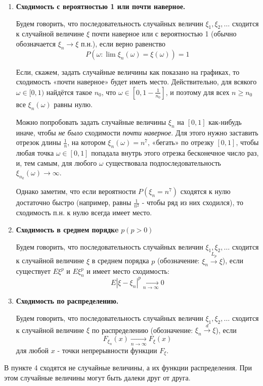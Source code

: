 \begin{enumerate}
	\item \textbf{Сходимость с вероятностью 1 или почти наверное.}
	
	Будем говорить, что последовательность случайных величин $\xi_1, \xi_2, \dots$ сходится к случайной величине $\xi$ почти наверное или с вероятностью 1 (обычно обозначается $\xi_n \to \xi$ п.н.), если верно равенство
	\[ P(\omega : \lim \xi_n (\omega) = \xi (\omega)) = 1 \]
	
	\begin{exmp}
		Если, скажем, задать случайные величины как показано на графиках, то сходимость «почти наверное»  будет иметь место. Действительно, для всякого $\omega \in [0, 1)$ найдётся такое $n_0$, что $\omega \in \left[ 0, 1 - \frac{1}{n_0} \right]$, и поэтому для всех $n \ge n_0$ все $\xi_n (\omega)$ равны нулю.
		
		Можно попробовать задать случайные величины $\xi_n$ на $[0, 1]$ как-нибудь иначе, чтобы \textit{не было} сходимости \textit{почти наверное}. Для этого нужно заставить отрезок длины $\frac{1}{n}$, на котором $\xi_n (\omega) = n^7$, «бегать» по отрезку $[0, 1]$, чтобы любая точка $\omega \in [0, 1]$ попадала внутрь этого отрезка бесконечное число раз, и, тем самым, для любого $\omega$ существовала подпоследовательность $\xi_{n_k} (\omega) \to \infty$.
		
		Однако заметим, что если вероятности $P(\xi_n = n^7)$ сходятся к нулю достаточно быстро (например, равны $\frac{1}{n^2}$ - чтобы ряд из них сходился), то сходимость п.н. к нулю всегда имеет место.
	\end{exmp}
	
	\item \textbf{Сходимость в среднем порядкe} $p(p > 0)$
	
	Будем говорить, что последовательность случайных величин $\xi_1, \xi_2, \dots$ сходится к случайной величине $\xi$ в среднем порядка $p$ (обозначение: $\xi_n \overset{L_p}{\to} \xi$), если существует $E\xi^p$ и $E\xi_n^p$ и имеет место сходимость:
	\[ E |\xi - \xi_n|^p \underset{n \to \infty}{\to} 0 \]
	
	\item \textbf{Сходимость по распределению.}
	
	Будем говорить, что последовательность случайных величин $\xi_1, \xi_2, \dots$ сходится к случайной величине $\xi$ по распределению (обозначение: $\xi_n \overset{d}{\to} \xi$), если
	\[ F_{\xi_n} (x) \underset{n \to \infty}{\to} F_{\xi} (x) \]
	для любой $x$ - точки непрерывности функции $F_{\xi}$.
\end{enumerate}
\begin{remark}
	В пункте 4 сходятся не случайные величины, а их функции распределения. При этом случайные величины могут быть далеки друг от друга.
\end{remark}

